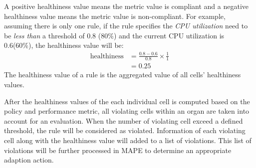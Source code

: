 \documentclass{seal_thesis}
\begin{document}
A positive healthiness value means the metric value is compliant and a negative healthiness value means the metric value is non-compliant.
For example, assuming there is only one rule, if the rule specifies the \textit{CPU utilization} need to be \textit{less than} a threshold of 0.8 (80\%) and the current CPU utilization is 0.6(60\%), the healthiness value will be:
\begin{align*}
\textrm{healthiness} &= \frac{0.8 - 0.6}{0.8} \times \frac{1}{1}\\
&= 0.25
\end{align*}
The healthiness value of a rule is the aggregated value of all cells' healthiness values.

After the healthiness values of the each individual cell is computed based on the policy and performance metric, all violating cells within an organ are taken into account for an evaluation.
When the number of violating cell exceed a defined threshold, the rule will be considered as violated.
Information of each violating cell along with the healthiness value will added to a list of violations.
This list of violations will be further processed in MAPE to determine an appropriate adaption action.

\end{document}
